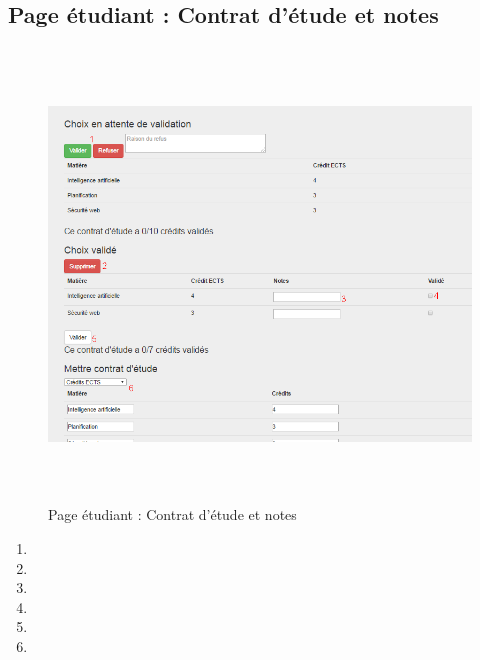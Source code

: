          
    
     \subsection{Page étudiant : Contrat d'étude et notes}
     \label{en}
     \begin{figure}[H]
     	\centering
     	\includegraphics[width=16cm,height=12cm]{Images/Admin/note_admin.png}
     	\caption{Page étudiant : Contrat d'étude et notes}
     	
     \end{figure}
     \begin{enumerate}
     	\item
     	\item
     	\item
     	\item
     	\item
     	\item
     \end{enumerate}
     
     
